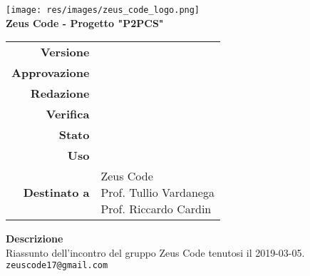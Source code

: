 \thispagestyle{empty}
\begin{titlepage}
	\begin{center}
		\texttt{[image: res/images/zeus\_code\_logo.png]}\\
		\large \textbf{Zeus Code - Progetto "P2PCS"} \\
		\vfill
		\Huge \textbf{\doctitle}
		\vspace*{\fill}
        
        \vfill
        \large

        \begin{tabular}{r|l}
                        \textbf{Versione} & \rev{} \\
                        \textbf{Approvazione} & \approv{} \\
                        \textbf{Redazione} & \red{} \\
                        \textbf{Verifica} & \ver{} \\
                        \textbf{Stato} & \stato{} \\
                        \textbf{Uso} & \uso{} \\
                        \textbf{Destinato a} & \parbox[t]{5cm}{Zeus Code
                        \\Prof. Tullio Vardanega\\Prof. Riccardo Cardin}
                \end{tabular}
                \vfill
                \normalsize
                \textbf{Descrizione}\\
                Riassunto dell'incontro del gruppo Zeus Code tenutosi il 2019-03-05.\\
                \vfill
                \small
                \texttt{zeuscode17@gmail.com}

	\end{center}
\end{titlepage}